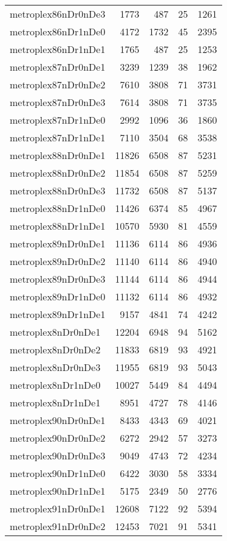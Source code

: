 \begin{longtable}{lrrrr}
metroplex86nDr0nDe3 & 1773 & 487 & 25 & 1261 \\
metroplex86nDr1nDe0 & 4172 & 1732 & 45 & 2395 \\
metroplex86nDr1nDe1 & 1765 & 487 & 25 & 1253 \\
metroplex87nDr0nDe1 & 3239 & 1239 & 38 & 1962 \\
metroplex87nDr0nDe2 & 7610 & 3808 & 71 & 3731 \\
metroplex87nDr0nDe3 & 7614 & 3808 & 71 & 3735 \\
metroplex87nDr1nDe0 & 2992 & 1096 & 36 & 1860 \\
metroplex87nDr1nDe1 & 7110 & 3504 & 68 & 3538 \\
metroplex88nDr0nDe1 & 11826 & 6508 & 87 & 5231 \\
metroplex88nDr0nDe2 & 11854 & 6508 & 87 & 5259 \\
metroplex88nDr0nDe3 & 11732 & 6508 & 87 & 5137 \\
metroplex88nDr1nDe0 & 11426 & 6374 & 85 & 4967 \\
metroplex88nDr1nDe1 & 10570 & 5930 & 81 & 4559 \\
metroplex89nDr0nDe1 & 11136 & 6114 & 86 & 4936 \\
metroplex89nDr0nDe2 & 11140 & 6114 & 86 & 4940 \\
metroplex89nDr0nDe3 & 11144 & 6114 & 86 & 4944 \\
metroplex89nDr1nDe0 & 11132 & 6114 & 86 & 4932 \\
metroplex89nDr1nDe1 & 9157 & 4841 & 74 & 4242 \\
metroplex8nDr0nDe1 & 12204 & 6948 & 94 & 5162 \\
metroplex8nDr0nDe2 & 11833 & 6819 & 93 & 4921 \\
metroplex8nDr0nDe3 & 11955 & 6819 & 93 & 5043 \\
metroplex8nDr1nDe0 & 10027 & 5449 & 84 & 4494 \\
metroplex8nDr1nDe1 & 8951 & 4727 & 78 & 4146 \\
metroplex90nDr0nDe1 & 8433 & 4343 & 69 & 4021 \\
metroplex90nDr0nDe2 & 6272 & 2942 & 57 & 3273 \\
metroplex90nDr0nDe3 & 9049 & 4743 & 72 & 4234 \\
metroplex90nDr1nDe0 & 6422 & 3030 & 58 & 3334 \\
metroplex90nDr1nDe1 & 5175 & 2349 & 50 & 2776 \\
metroplex91nDr0nDe1 & 12608 & 7122 & 92 & 5394 \\
metroplex91nDr0nDe2 & 12453 & 7021 & 91 & 5341 \\

\end{longtable}
